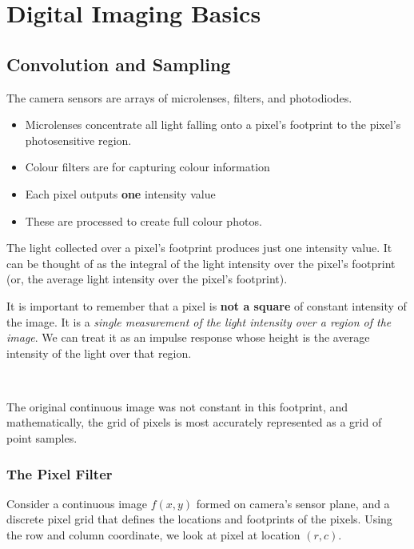 \section{Digital Imaging Basics}

\subsection{Convolution and Sampling}

The camera sensors are arrays of microlenses, filters, and photodiodes. 
\begin{itemize}
    \item Microlenses concentrate all light falling onto a pixel's footprint to the pixel's photosensitive region. 
    \item Colour filters are for capturing colour information
    \item Each pixel outputs \textbf{one} intensity value
    \item These are processed to create full colour photos. 
\end{itemize}

The light collected over a pixel's footprint produces just one intensity value. It can be thought of as the integral of the light intensity over the pixel's footprint (or, the average light intensity over the pixel's footprint).

\begin{remark}
    It is important to remember that a pixel is \textbf{not a square} of constant intensity of the image. It is a \textit{single measurement of the light intensity over a region of the image}. We can treat it as an impulse response whose height is the average intensity of the light over that region.

    {~~~}

    The original continuous image was not constant in this footprint, and mathematically, the grid of pixels is most accurately represented as a grid of point samples. 
\end{remark}

\subsubsection{The Pixel Filter}

Consider a continuous image $f(x, y)$ formed on camera's sensor plane, and a discrete pixel grid that defines the locations and footprints of the pixels. Using the row and column coordinate, we look at pixel at location $(r, c)$. 

